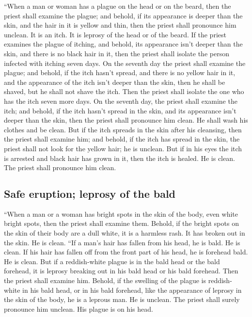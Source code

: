  ``When a man or woman has a plague on the head or on the
beard,  then the priest shall examine the plague; and
behold, if its appearance is deeper than the skin, and the hair in it is
yellow and thin, then the priest shall pronounce him unclean. It is an
itch. It is leprosy of the head or of the beard.  If the
priest examines the plague of itching, and behold, its appearance isn't
deeper than the skin, and there is no black hair in it, then the priest
shall isolate the person infected with itching seven days.
 On the seventh day the priest shall examine the plague;
and behold, if the itch hasn't spread, and there is no yellow hair in
it, and the appearance of the itch isn't deeper than the skin,
 then he shall be shaved, but he shall not shave the
itch. Then the priest shall isolate the one who has the itch seven more
days.  On the seventh day, the priest shall examine the
itch; and behold, if the itch hasn't spread in the skin, and its
appearance isn't deeper than the skin, then the priest shall pronounce
him clean. He shall wash his clothes and be clean.  But
if the itch spreads in the skin after his cleansing, 
then the priest shall examine him; and behold, if the itch has spread in
the skin, the priest shall not look for the yellow hair; he is unclean.
 But if in his eyes the itch is arrested and black hair
has grown in it, then the itch is healed. He is clean. The priest shall
pronounce him clean.

\hypertarget{safe-eruption-leprosy-of-the-bald}{%
\subsection{Safe eruption; leprosy of the
bald}\label{safe-eruption-leprosy-of-the-bald}}

 ``When a man or a woman has bright spots in the skin of
the body, even white bright spots,  then the priest shall
examine them. Behold, if the bright spots on the skin of their body are
a dull white, it is a harmless rash. It has broken out in the skin. He
is clean.  ``If a man's hair has fallen from his head, he
is bald. He is clean.  If his hair has fallen off from
the front part of his head, he is forehead bald. He is clean.
 But if a reddish-white plague is in the bald head or the
bald forehead, it is leprosy breaking out in his bald head or his bald
forehead.  Then the priest shall examine him. Behold, if
the swelling of the plague is reddish-white in his bald head, or in his
bald forehead, like the appearance of leprosy in the skin of the body,
 he is a leprous man. He is unclean. The priest shall
surely pronounce him unclean. His plague is on his head.


